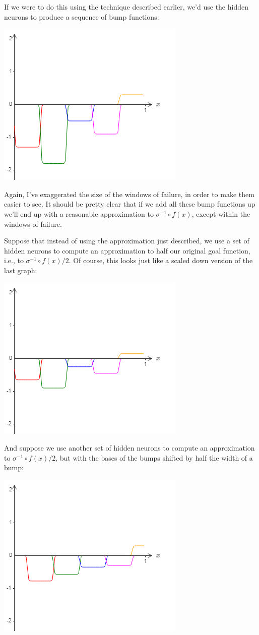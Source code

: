 If we were to do this using the technique described earlier, we'd use the hidden neurons to produce a sequence of bump functions:

{\centering \includegraphics[width=.5\textwidth,]{pic/wigglyfn41} \par}

Again, I've exaggerated the size of the windows of failure, in order to make them easier to see. It should be pretty clear that if we add all these bump functions up we'll end up with a reasonable approximation to $\sigma^{-1}\circ f(x)$, except within the windows of failure.

Suppose that instead of using the approximation just described, we use a set of hidden neurons to compute an approximation to half our original goal function, i.e., to $\sigma^{-1}\circ f(x)/2$. Of course, this looks just like a scaled down version of the last graph:

{\centering \includegraphics[width=.5\textwidth,]{pic/wigglyfn42} \par}

And suppose we use another set of hidden neurons to compute an approximation to $\sigma^{-1}\circ f(x)/2$, but with the bases of the bumps shifted by half the width of a bump:

{\centering \includegraphics[width=.5\textwidth,]{pic/wigglyfn43} \par}

